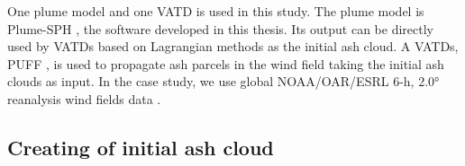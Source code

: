 One plume model and one VATD is used in this study.
The plume model is Plume-SPH \citep{gmd-2017-119}, the software developed in this thesis. Its output can be directly used by VATDs  based on Lagrangian methods as the initial ash cloud. A VATDs, PUFF \citep{tanaka1991development,searcy1998puff}, is used to propagate ash parcels in the wind field taking the initial ash clouds as input. In the case study, we use global NOAA/OAR/ESRL 6-h, 2.0° reanalysis wind fields data \citep{whitaker2004reanalysis, compo2006feasibility, compo2011twentieth}.

\subsection{Creating of initial ash cloud}

